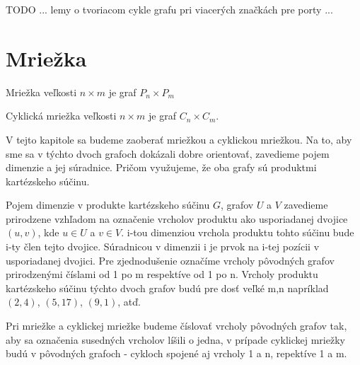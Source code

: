 TODO ... lemy o tvoriacom cykle grafu pri viacerých značkách pre porty ...

\iffalse
\begin{lem}
Najmenší počet krokov na ktoré môže agent skonštruovať nejakú množinu
portových hrán M, ak dovtedy skonštruoval graf G, je dĺžka najkratšieho
sledu v konštruovanom grafe, ktorý obsahuje oba konce všetkých portových hrán
z M a pred každým výskytom portovej hrany, ktorá sa nenachádza v G, obsahuje
také dva výskyty ich koncov, že agent mal k dispozícii značku pre porty na
konštrukciu tejto hrany.
\end{lem}
\begin{proof}
Agent musí najprv navštíviť konce portovej hrany, aby ju mohol vytvoriť.
Keďže nejde o kostrovú hranu, jej konce sú staršie ako ona. Ak by existoval
kratší taký sled, agent by mohol vykonať menej krokov.
\end{proof}
\fi


\section{Mriežka}
\begin{defin}
Mriežka veľkosti $ n \times m$ je graf $P_{n} \times P_{m}$
\end{defin}
\begin{defin}
Cyklická mriežka veľkosti $n \times m$ je graf $C_{n} \times C_{m}$.
\end{defin}

V tejto kapitole sa budeme zaoberať mriežkou a cyklickou mriežkou. Na to, aby sme sa v
týchto dvoch grafoch dokázali dobre orientovať, zavedieme pojem dimenzie a
jej súradnice. Pričom využujeme, že oba grafy sú produktmi kartézskeho
súčinu.

\begin{ozn}
Pojem dimenzie v produkte kartézskeho súčinu $G$, grafov $U$ a $V$ 
zavedieme prirodzene vzhľadom
na označenie vrcholov produktu ako usporiadanej dvojice $(u,v)$, kde $u \in
U$ a $v \in V$. i-tou dimenziou vrchola produktu tohto súčinu bude i-ty člen
tejto dvojice. Súradnicou v dimenzii i je prvok na i-tej pozícii v
usporiadanej dvojici. Pre zjednodušenie označíme vrcholy pôvodných grafov
prirodzenými číslami od 1 po m respektíve od 1 po n. Vrcholy produktu
kartézskeho súčinu týchto dvoch grafov budú pre dosť veľké m,n napríklad
$(2,4)$, $(5,17)$, $(9,1)$, atď.
\end{ozn}

\begin{pozn}
Pri mriežke a cyklickej mriežke budeme číslovať vrcholy pôvodných grafov
tak, aby sa označenia susedných vrcholov líšili o jedna, v prípade cyklickej
mriežky budú v pôvodných grafoch - cykloch spojené aj vrcholy 1 a n,
repektíve 1 a m.
\end{pozn}


